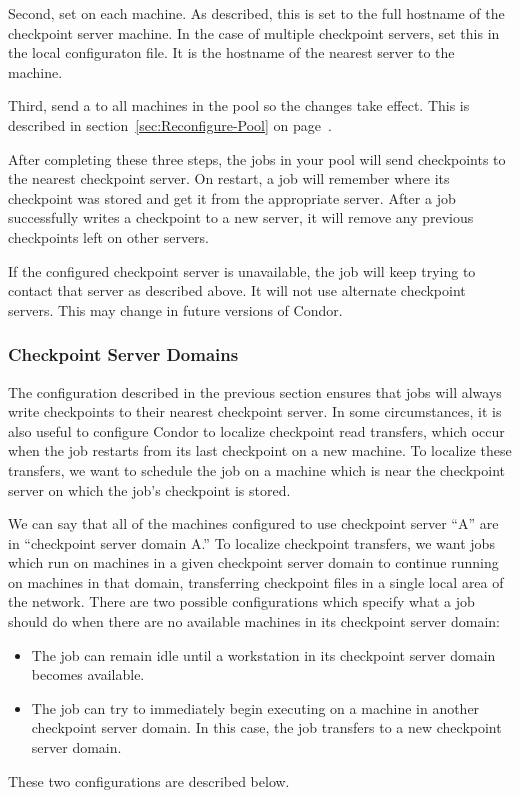 Second, set  on each machine.
As described, this is set to the full hostname of the
checkpoint server machine.
In the case of multiple checkpoint servers, set this
in the local configuraton file.
It is
the hostname of the nearest server to the machine.

Third, send a
 to all machines in the pool so the changes take
effect.
This is described in section~\ref{sec:Reconfigure-Pool} on
page~\pageref{sec:Reconfigure-Pool}.

After completing these three steps, the jobs in your pool will
send checkpoints to the nearest checkpoint server.
On restart, a job will remember where its checkpoint was
stored and get it from the appropriate server.
After a job successfully writes a checkpoint to a new server, it will
remove any previous checkpoints left on other servers.

\Note If the configured checkpoint server is unavailable, the job will
keep trying to contact that server as described above.
It will not use alternate checkpoint servers.
This may change in future versions of Condor.

\subsubsection{\label{Checkpoint-Server-Domains} 
Checkpoint Server Domains}

The configuration described in the previous section ensures that jobs
will always write checkpoints to their nearest checkpoint server.  In
some circumstances, it is also useful to configure Condor to localize
checkpoint read transfers, which occur when the job restarts from its
last checkpoint on a new machine.  To localize these transfers, we
want to schedule the job on a machine which is near the checkpoint
server on which the job's checkpoint is stored.

We can say that all of the machines configured to use checkpoint
server ``A'' are in ``checkpoint server domain A.''  To localize
checkpoint transfers, we want jobs which run on machines in a given
checkpoint server domain to continue running on machines in that
domain, transferring checkpoint files in a single local area of the
network.  There are two possible configurations which specify what a
job should do when there are no available machines in its checkpoint
server domain:
\begin{itemize}
\item The job can remain idle until a workstation in its checkpoint
server domain becomes available.
\item The job can try to immediately begin executing on a machine
in another checkpoint server domain.  In this case, the job transfers
to a new checkpoint server domain.
\end{itemize}
These two configurations are described below.

